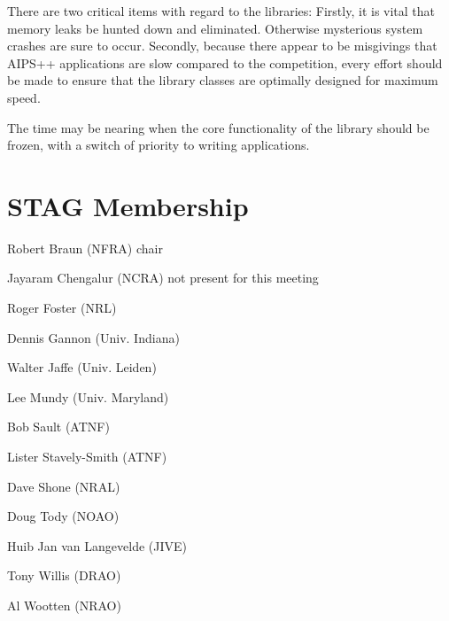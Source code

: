 There are two critical items with regard to the libraries: Firstly, it is
vital that memory leaks be hunted down and eliminated. Otherwise
mysterious system crashes are sure to occur. Secondly, because there
appear to be misgivings that AIPS++ applications are slow compared
to the competition, every effort should be made to ensure that
the library classes are optimally designed for maximum speed.

The time may be nearing when the core functionality of the library
should be frozen, with a switch of priority to writing applications.

\section{STAG Membership}
\parindent=0cm

Robert Braun (NFRA) chair

Jayaram Chengalur (NCRA) not present for this meeting

Roger Foster (NRL)

Dennis Gannon (Univ. Indiana)

Walter Jaffe (Univ. Leiden)

Lee Mundy (Univ. Maryland)

Bob Sault (ATNF)

Lister Stavely-Smith (ATNF)

Dave Shone (NRAL)

Doug Tody (NOAO)

Huib Jan van Langevelde (JIVE)

Tony Willis (DRAO)

Al Wootten (NRAO)
%
